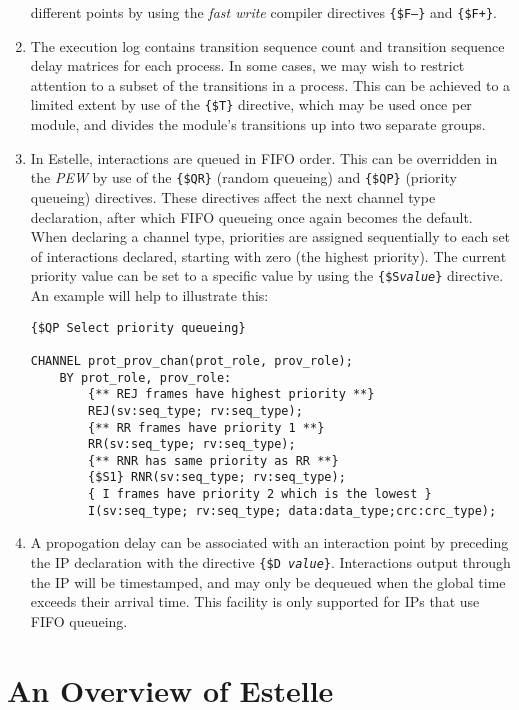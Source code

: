 \begin{enumerate}
different points by using the {\em fast write} compiler directives
{\tt \{\$F--\}} and {\tt \{\$F+\}}.
\item The execution log contains transition sequence count and transition
sequence delay matrices for each process. In some cases, we may wish
to restrict attention to a subset of the transitions in a process.
This can be achieved to a limited extent by use of the {\tt \{\$T\}}
directive, which may be used once per module, and divides the
module's transitions up into two separate groups.
\item In Estelle, interactions are queued in FIFO order. This can be
overridden in the {\em PEW} by use of the {\tt \{\$QR\}} (random
queueing) and {\tt \{\$QP\}} (priority queueing) directives. These
directives affect the next channel type declaration, after which FIFO
queueing once again becomes the default. When declaring a channel
type, priorities are assigned sequentially to each set of
interactions declared, starting with zero (the highest priority). The
current priority value can be set to a specific value by using the
{\tt \{\$S{\em value}\}} directive. An example will help to
illustrate this:

\begin{verbatim}
{$QP Select priority queueing}

CHANNEL prot_prov_chan(prot_role, prov_role);
    BY prot_role, prov_role:
        {** REJ frames have highest priority **}
        REJ(sv:seq_type; rv:seq_type);
        {** RR frames have priority 1 **}
        RR(sv:seq_type; rv:seq_type);
        {** RNR has same priority as RR **}
        {$S1} RNR(sv:seq_type; rv:seq_type);
        { I frames have priority 2 which is the lowest }
        I(sv:seq_type; rv:seq_type; data:data_type;crc:crc_type);
\end{verbatim}

\item A propogation delay can be associated with an interaction point
by preceding the IP declaration with the directive {\tt \{\$D{\em
value}\}}. Interactions output through the IP will be timestamped,
and may only be dequeued when the global time exceeds their arrival
time. This facility is only supported for IPs that use FIFO queueing.
\end{enumerate}

\newpage
\section[An Overview of Estelle]{An Overview of Estelle}

